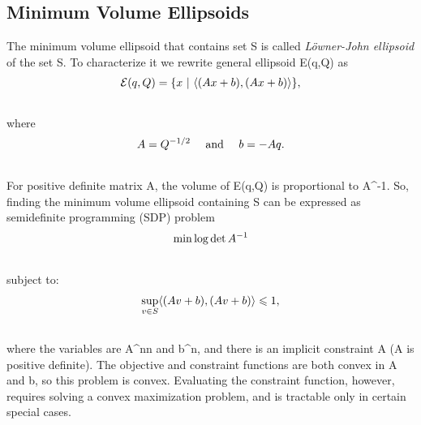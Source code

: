 \documentclass[letterpaper,10pt,english]{sphinxmanual}
\begin{document}
\subsection{Minimum Volume Ellipsoids}
\label{chap_ellcalc:minimum-volume-ellipsoids}
The minimum volume ellipsoid that contains set S is called
\emph{Löwner-John ellipsoid} of the set S. To characterize it we
rewrite general ellipsoid {\mathcal E}(q,Q) as
\begin{gather}
\begin{split}{\mathcal E}(q,Q) = \{x ~|~ \langle (Ax + b), (Ax + b)\rangle \},\end{split}\notag\\\begin{split}\end{split}\notag
\end{gather}
where
\begin{gather}
\begin{split}A = Q^{-1/2} ~~~ \mbox{ and } ~~~ b = -Aq .\end{split}\notag\\\begin{split}\end{split}\notag
\end{gather}
For positive definite matrix A, the volume of
{\mathcal E}(q,Q) is proportional to \det A^{-1}. So,
finding the minimum volume ellipsoid containing S can be
expressed as semidefinite programming (SDP) problem
\begin{gather}
\begin{split}\min \log \det A^{-1}\end{split}\notag\\\begin{split}\end{split}\notag
\end{gather}
subject to:
\begin{gather}
\begin{split}\sup_{v\in S} \langle (Av + b), (Av + b)\rangle \leqslant1,\end{split}\notag\\\begin{split}\end{split}\notag
\end{gather}
where the variables are A^{n\times n} and
b^n, and there is an implicit constraint
A (A is positive definite). The objective and
constraint functions are both convex in A and b, so this
problem is convex. Evaluating the constraint function, however, requires
solving a convex maximization problem, and is tractable only in certain
special cases.
\end{document}
